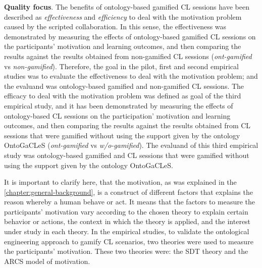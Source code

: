 \textbf{Quality focus}. The benefits of ontology-based gamified CL sessions have been described as \emph{effectiveness} and \emph{efficiency} to deal with the motivation problem caused by the scripted collaboration. In this sense, the effectiveness was demonstrated by measuring the effects of ontology-based gamified CL sessions on the participants' motivation and learning outcomes, and then comparing the results against the results obtained from non-gamified CL sessions (\emph{ont-gamified} vs \emph{non-gamified}). Therefore, the goal in the pilot, first and second empirical studies was to evaluate the effectiveness to deal with the motivation problem; and the evaluand was ontology-based gamified and non-gamified CL sessions. The efficacy to deal with the motivation problem was defined as goal of the third empirical study, and it has been demonstrated by measuring the effects of ontology-based CL sessions on the participation' motivation and learning outcomes, and then comparing the results against the results obtained from CL sessions that were gamified without using the support given by the ontology OntoGaCLeS (\emph{ont-gamified} vs \emph{w/o-gamified}). The evaluand of this third empirical study was ontology-based gamified and CL sessions that were gamified without using the support given by the ontology OntoGaCLeS.

It is important to clarify here, that the motivation, as was explained in the \autoref{chapter:general-background}, is a construct of different factors that explains the reason whereby a human behave or act. It means that the factors to measure the participants' motivation vary according to the chosen theory to explain certain behavior or actions, the context in which the theory is applied, and the interest under study in each theory. In the empirical studies, to validate the ontological engineering approach to gamify CL scenarios, two theories were used to measure the participants' motivation. These two theories were: the SDT theory and the ARCS model of motivation.

